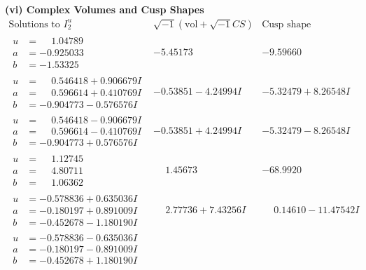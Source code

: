 \documentclass[1p]{elsarticle_modified}
\theoremstyle{definition}
\newcommand{\I}{\sqrt{-1}}
\begin{document}
\newpage\flushleft \textbf{(vi) Complex Volumes and Cusp Shapes}
$$\begin{array}{c|c|c}  
\text{Solutions to }I^u_{2}& \I (\text{vol} + \sqrt{-1}CS) & \text{Cusp shape}\\
 \hline 
\begin{aligned}
u &= \phantom{-}1.04789\phantom{ +0.000000I} \\
a &= -0.925033\phantom{ +0.000000I} \\
b &= -1.53325\phantom{ +0.000000I}\end{aligned}
 & -5.45173\phantom{ +0.000000I} & -9.59660\phantom{ +0.000000I} \\ \hline\begin{aligned}
u &= \phantom{-}0.546418 + 0.906679 I \\
a &= \phantom{-}0.596614 + 0.410769 I \\
b &= -0.904773 - 0.576576 I\end{aligned}
 & -0.53851 - 4.24994 I & -5.32479 + 8.26548 I \\ \hline\begin{aligned}
u &= \phantom{-}0.546418 - 0.906679 I \\
a &= \phantom{-}0.596614 - 0.410769 I \\
b &= -0.904773 + 0.576576 I\end{aligned}
 & -0.53851 + 4.24994 I & -5.32479 - 8.26548 I \\ \hline\begin{aligned}
u &= \phantom{-}1.12745\phantom{ +0.000000I} \\
a &= \phantom{-}4.80711\phantom{ +0.000000I} \\
b &= \phantom{-}1.06362\phantom{ +0.000000I}\end{aligned}
 & \phantom{-}1.45673\phantom{ +0.000000I} & -68.9920\phantom{ +0.000000I} \\ \hline\begin{aligned}
u &= -0.578836 + 0.635036 I \\
a &= -0.180197 + 0.891009 I \\
b &= -0.452678 - 1.180190 I\end{aligned}
 & \phantom{-}2.77736 + 7.43256 I & \phantom{-}0.14610 - 11.47542 I \\ \hline\begin{aligned}
u &= -0.578836 - 0.635036 I \\
a &= -0.180197 - 0.891009 I \\
b &= -0.452678 + 1.180190 I\end{aligned}

\end{array}$$
\end{document}
